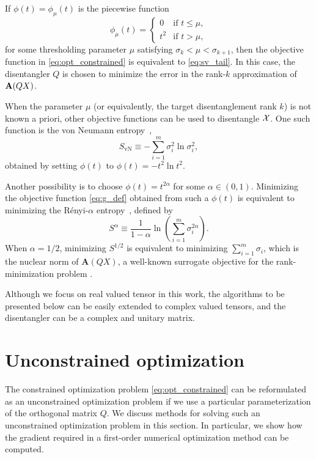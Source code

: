 \documentclass[pdflatex,sn-mathphys-num]{sn-jnl}
\newcounter{thm}[section]
\newcommand{\bfA}[1]{{\textbf A}(#1)}
\begin{document}
If $\phi(t) = \phi_{\mu}(t)$ is the piecewise function 
\begin{equation} \label{eq:Heaviside}
\phi_{\mu}(t) = \left \{
\begin{array}{ll}
0 & \mbox{if $t \leq \mu$}, \\
t^2 & \mbox{if $t  > \mu$},
\end{array}
\right.
\end{equation}
for some thresholding parameter $\mu$ satisfying $\sigma_k < \mu < \sigma_{k+1}$, then the objective function in \eqref{eq:opt_constrained} is equivalent to \eqref{eq:sv_tail}. In this case, the disentangler $Q$ is chosen to minimize the error in the rank-$k$ approximation of $\bfA{QX}$.

When the parameter $\mu$ (or equivalently, the target disentanglement rank $k$) is not known a priori, other objective functions can be used to disentangle ${\cal X}$. One such function is the von Neumann entropy~\cite{nielsenQuantumComputationQuantum2010}, 
\begin{equation}
S_\textrm{vN} \equiv - \sum_{i=1}^m \sigma_i^2 \ln \sigma_i^2, \label{eqn:vonneumann}
\end{equation}
obtained by setting $\phi(t)$ to 
$\phi(t) = -t^2\ln t^2$.

Another possibility is to choose $\phi(t)= t^{2\alpha}$ for some $\alpha \in (0,1)$. Minimizing the objective function \eqref{eq:g_def} obtained from such a $\phi(t)$ is equivalent to minimizing the Rényi-$\alpha$ entropy~\cite{verstraeteMatrixProductStates2006}, defined by
\begin{equation}
S^\alpha \equiv \frac{1}{1-\alpha}\ln(\sum_{i=1}^m \sigma_i^{2\alpha}).
\label{eqn:renyi}
\end{equation}
When $\alpha=1/2$, minimizing $S^{1/2}$ is equivalent to minimizing $\sum_{i=1}^m \sigma_i$, which is the nuclear norm of $\textbf{A}(QX)$, a well-known surrogate objective for the rank-minimization problem \cite{Recht2010, Lu2015}. 

Although we focus on real valued tensor in this work, the algorithms to be presented below can be easily extended to complex valued tensors, and the disentangler can be a complex and unitary matrix.

\section{Unconstrained optimization}
\label{sec:unconstrained}
The constrained optimization problem \eqref{eq:opt_constrained} can be reformulated as an unconstrained optimization problem if we use a particular parameterization of the orthogonal matrix $Q$. We discuss methods for solving such an unconstrained optimization problem in this section. In particular, we show how the gradient required in a first-order numerical optimization method can be computed.
\end{document}

